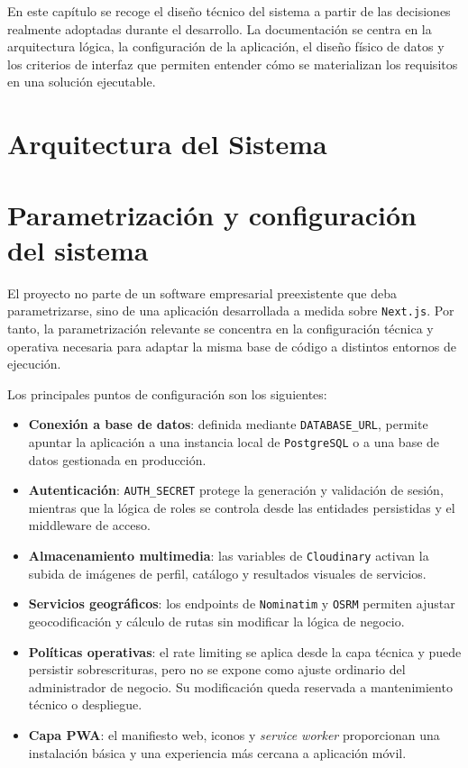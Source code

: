 En este capítulo se recoge el diseño técnico del sistema a partir de las decisiones realmente adoptadas durante el desarrollo. La documentación se centra en la arquitectura lógica, la configuración de la aplicación, el diseño físico de datos y los criterios de interfaz que permiten entender cómo se materializan los requisitos en una solución ejecutable.

\section{Arquitectura del Sistema}
\label{sec:SystemArchitecture}


\section{Parametrización y configuración del sistema}

El proyecto no parte de un software empresarial preexistente que deba parametrizarse, sino de una aplicación desarrollada a medida sobre \texttt{Next.js}. Por tanto, la parametrización relevante se concentra en la configuración técnica y operativa necesaria para adaptar la misma base de código a distintos entornos de ejecución.

Los principales puntos de configuración son los siguientes:

\begin{itemize}
    \item \textbf{Conexión a base de datos}: definida mediante \texttt{DATABASE\_URL}, permite apuntar la aplicación a una instancia local de \texttt{PostgreSQL} o a una base de datos gestionada en producción.
    \item \textbf{Autenticación}: \texttt{AUTH\_SECRET} protege la generación y validación de sesión, mientras que la lógica de roles se controla desde las entidades persistidas y el middleware de acceso.
    \item \textbf{Almacenamiento multimedia}: las variables de \texttt{Cloudinary} activan la subida de imágenes de perfil, catálogo y resultados visuales de servicios.
    \item \textbf{Servicios geográficos}: los endpoints de \texttt{Nominatim} y \texttt{OSRM} permiten ajustar geocodificación y cálculo de rutas sin modificar la lógica de negocio.
    \item \textbf{Políticas operativas}: el rate limiting se aplica desde la capa técnica y puede persistir sobrescrituras, pero no se expone como ajuste ordinario del administrador de negocio. Su modificación queda reservada a mantenimiento técnico o despliegue.
    \item \textbf{Capa PWA}: el manifiesto web, iconos y \textit{service worker} proporcionan una instalación básica y una experiencia más cercana a aplicación móvil.
\end{itemize}

